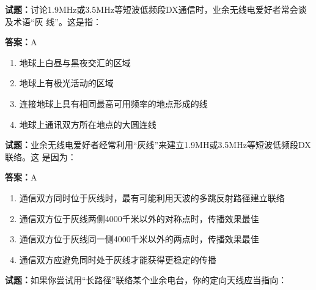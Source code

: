 \documentclass{ctexbook}
\begin{document}




\vspace{1em}

\textbf{试题：}讨论1.9MHz或3.5MHz等短波低频段DX通信时，业余无线电爱好者常会谈及术语“灰
线”。这是指： 

\textbf{答案：}A 

\begin{enumerate}[leftmargin=3em]
  \item 地球上白昼与黑夜交汇的区域 

  \item 地球上有极光活动的区域 

  \item 连接地球上具有相同最高可用频率的地点形成的线 

  \item 地球上通讯双方所在地点的大圆连线 

\end{enumerate}





\vspace{1em}

\textbf{试题：}业余无线电爱好者经常利用“灰线”来建立1.9MH或3.5MHz等短波低频段DX联络。这
是因为： 

\textbf{答案：}A 

\begin{enumerate}[leftmargin=3em]
  \item 通信双方同时位于灰线时，最有可能利用天波的多跳反射路径建立联络 

  \item 通信双方位于灰线两侧4000千米以外的对称点时，传播效果最佳 

  \item 通信双方位于灰线同一侧4000千米以外的两点时，传播效果最佳 

  \item 通信双方应避免同时处于灰线才能获得更稳定的传播 

\end{enumerate}





\vspace{1em}

\textbf{试题：}如果你尝试用“长路径”联络某个业余电台，你的定向天线应当指向： 
\end{document}
